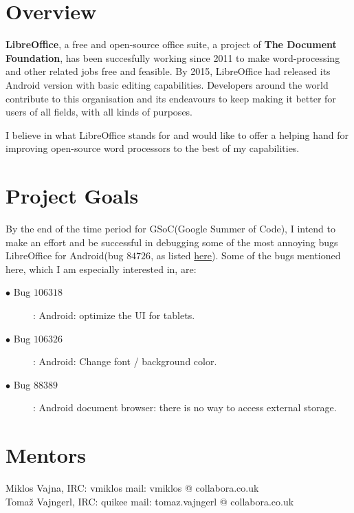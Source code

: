 \documentclass[a4paper]{article}
\author{ Difficulty:Medium\\\\\large{Rohit Das} \\ Freenode IRC nick: rohit\\+918961452125 | rohit.das950@gmail.com\\ Serampore, Hooghly, West Bengal, India. GMT+5:30}
\date{}
\begin{document}
\maketitle
\Large{\section*{Overview}
%

\hspace{20pt}\textbf{LibreOffice}, a free and open-source office suite, a project of \textbf{The Document Foundation}, has been succesfully working since 2011 to make word-processing and other related jobs free and feasible. By 2015, LibreOffice had released its Android version with basic editing capabilities. Developers around the world contribute to this organisation and its endeavours to keep making it better for users of all fields, with all kinds of purposes.

I believe in what LibreOffice stands for and would like to offer a helping hand for improving open-source word processors to the best of my capabilities.

\section*{Project Goals}

\hspace{20pt}By the end of the time period for GSoC(Google Summer of Code), I intend to make an effort and be successful in debugging some of the most annoying bugs LibreOffice for Android(bug $84726$, as listed \href{https://bugs.documentfoundation.org/showdependencytree.cgi?id=84726}{here}). Some of the bugs mentioned here, which I am especially interested in, are:
\begin{description}
\item[$\bullet$ Bug $106318$]: Android: optimize the UI for tablets.
\item[$\bullet$ Bug $106326$]:  Android: Change font / background color.
\item[$\bullet$ Bug \hspace{5pt}$88389$]: Android document browser: there is no way to access external storage.
\end{description}

\section*{Mentors}
Miklos Vajna, IRC: vmiklos mail: vmiklos @ collabora.co.uk\\
Tomaž Vajngerl, IRC: quikee mail: tomaz.vajngerl @ collabora.co.uk


}
\end{document}
